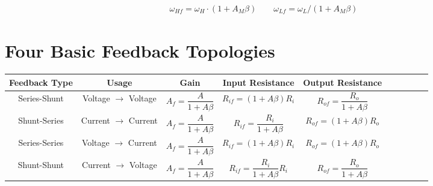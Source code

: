 \begin{equation*}
  \begin{aligned}
    \omega_{Hf} = \omega_H \cdot \left( 1 + A_M \beta \right) \quad\quad \omega_{Lf} = \omega_L / \left( 1 + A_M \beta \right)
  \end{aligned}
\end{equation*}

\section{Four Basic Feedback Topologies}

\begin{table}[h]
  \centering
  \begin{tabular}{|Sc|Sc|Sc|Sc|Sc|}
    \hline
    Feedback Type & Usage & Gain & Input Resistance & Output Resistance \\
    \hline
    Series-Shunt & Voltage $\rightarrow$ Voltage & $A_f = \dfrac{A}{1 + A \beta} $ & $ R_{if} = \left( 1 + A \beta \right) R_i$ & $R_{of} = \dfrac{R_o}{1 + A \beta} $ \\
    \hline
    Shunt-Series & Current $\rightarrow$ Current & $A_f = \dfrac{A}{1 + A \beta} $ & $ R_{if} = \dfrac{R_i}{1 + A \beta} $ & $R_{of} = \left( 1 + A \beta \right) R_o $ \\
    \hline
    Series-Series & Voltage $\rightarrow$ Current & $A_f = \dfrac{A}{1 + A \beta} $ & $ R_{if} = \left( 1 + A \beta \right) R_i$ & $R_{of} = \left( 1 + A \beta \right) R_o $ \\
    \hline
    Shunt-Shunt & Current $\rightarrow$ Voltage & $A_f = \dfrac{A}{1 + A \beta} $ & $ R_{if} = \dfrac{R_i}{1 + A \beta}  R_i$ & $R_{of} = \dfrac{R_o}{1 + A \beta} $ \\
    \hline
  \end{tabular}
\end{table}


